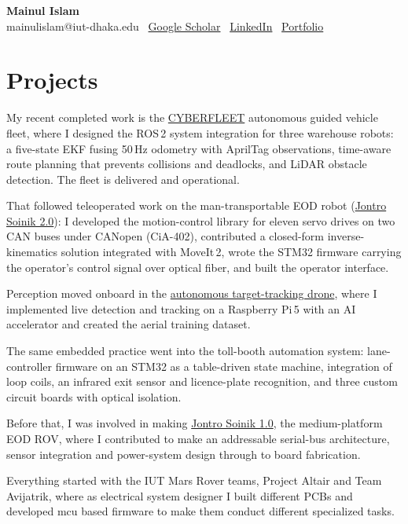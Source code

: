 \documentclass[11pt,a4paper]{article}
\begin{document}
\begin{center}
{\LARGE\bfseries Mainul Islam} \\[5pt]
mainulislam@iut-dhaka.edu \textbar\ \href{https://scholar.google.com/citations?user=mHfGHugAAAAJ\&hl=en}{Google Scholar} \textbar\ \href{https://www.linkedin.com/in/mainul-islam-254071205/}{LinkedIn} \textbar\ \href{https://mainul-islam-07.github.io/mainulislam.github.io/}{Portfolio}
\end{center}

\section*{Projects}

My recent completed work is the \href{https://www.youtube.com/watch?v=TkmOu6lCBTw}{CYBERFLEET} autonomous guided vehicle fleet, where I designed the ROS\,2 system integration for three warehouse robots: a five-state EKF fusing 50\,Hz odometry with AprilTag observations, time-aware route planning that prevents collisions and deadlocks, and LiDAR obstacle detection. The fleet is delivered and operational.

That followed teleoperated work on the man-transportable EOD robot (\href{https://www.youtube.com/watch?v=fLiwTvl2xmI}{Jontro Soinik 2.0}): I developed the motion-control library for eleven servo drives on two CAN buses under CANopen (CiA-402), contributed a closed-form inverse-kinematics solution integrated with MoveIt\,2, wrote the STM32 firmware carrying the operator's control signal over optical fiber, and built the operator interface.

Perception moved onboard in the \href{https://www.youtube.com/watch?v=MLrD0SuG4Q0}{autonomous target-tracking drone}, where I implemented live detection and tracking on a Raspberry Pi\,5 with an AI accelerator and created the aerial training dataset.

The same embedded practice went into the toll-booth automation system: lane-controller firmware on an STM32 as a table-driven state machine, integration of loop coils, an infrared exit sensor and licence-plate recognition, and three custom circuit boards with optical isolation.

Before that, I was involved in making \href{https://www.youtube.com/watch?v=3r5VhLD1Ths}{Jontro Soinik 1.0}, the medium-platform EOD ROV, where I contributed to make an addressable serial-bus architecture, sensor integration and power-system design through to board fabrication.

Everything started with the IUT Mars Rover teams, Project Altair and Team Avijatrik, where as electrical system designer I built different PCBs and developed mcu based firmware to make them conduct different specialized tasks.
\end{document}
